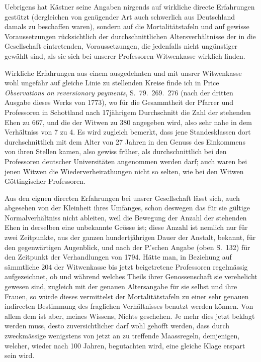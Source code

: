 \documentclass[12pt,a4paper]{article}
\begin{document}
Uebrigens hat K\"astner seine Angaben nirgends auf wirkliche directe Erfahrungen gest\"utzt (dergleichen von gen\"ugender Art auch schwerlich aus Deutschland damals zu beschaffen waren), sondern auf die Mortalit\"atstafeln und auf gewisse Voraussetzungen r\"ucksichtlich der durchschnittlichen Altersverh\"altnisse der in die Gesellschaft eintretenden, Voraussetzungen, die jedenfalls nicht ung\"unstiger gew\"ahlt sind, als sie sich bei unserer Professoren-Witwenkasse wirklich finden.

Wirkliche Erfahrungen aus einem ausgedehnten und mit unsrer Witwenkasse wohl ungef\"ahr auf gleiche Linie zu stellenden Kreise finde ich in Price \textit{Observations on reversionary payments}, S.\ 79.\ 269.\ 276 (nach der dritten Ausgabe dieses Werks von 1773), wo f\"ur die Gesammtheit der Pfarrer und Professoren in Schottland nach 17j\"ahrigem Durchschnitt die Zahl der stehenden Ehen zu 667, und die der Witwen zu 380 angegeben wird, also sehr nahe in dem Verh\"altniss von 7 zu 4. Es wird zugleich bemerkt, dass jene Standesklassen dort durchschnittlich mit dem Alter von 27 Jahren in den Genuss des Einkommens von ihren Stellen kamen, also gewiss fr\"uher, als durchschnittlich bei den Professoren deutscher Universit\"aten angenommen werden darf; auch waren bei jenen Witwen die Wiederverheirathungen nicht so selten, wie bei den Witwen G\"ottingischer Professoren.

Aus den eignen directen Erfahrungen bei unsrer Gesellschaft l\"asst sich, auch abgesehen von der Kleinheit ihres Umfanges, schon deswegen das f\"ur sie g\"ultige Normalverh\"altniss nicht ableiten, weil die Bewegung der Anzahl der stehenden Ehen in derselben eine unbekannte Gr\"osse ist; diese Anzahl ist nemlich nur f\"ur zwei Zeitpunkte, aus der ganzen hundertj\"ahrigen Dauer der Anstalt, bekannt, f\"ur den gegenw\"artigen Augenblick, und nach der P.'schen Angabe (oben S.\ 132) f\"ur den Zeitpunkt der Verhandlungen von 1794. H\"atte man, in Beziehung auf s\"ammtliche 204 der Witwenkasse bis jetzt beigetretene Professoren regelm\"assig aufgezeichnet, ob und w\"ahrend welches Theils ihrer Genossenschaft sie verehelicht gewesen sind, zugleich mit der genauen Altersangabe f\"ur sie selbst und ihre Frauen, so w\"urde dieses vermittelst der Mortalit\"atstafeln zu einer sehr genauen indirecten Bestimmung des fraglichen Verh\"altnisses benutzt werden k\"onnen. Von allem dem ist aber, meines Wissens, Nichts geschehen. Je mehr dies jetzt beklagt werden muss, desto zuversichtlicher darf wohl gehofft werden, dass durch zweckm\"assige wenigstens von jetzt an zu treffende Maassregeln, demjenigen, welcher, wieder nach 100 Jahren, begutachten wird, eine gleiche Klage erspart sein wird.
\end{document}
